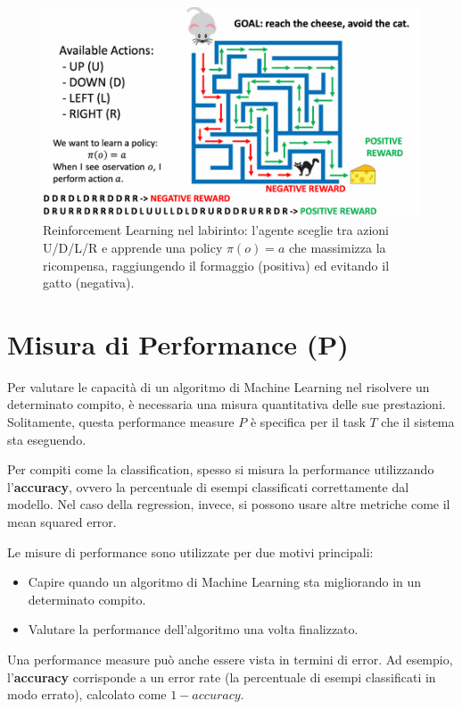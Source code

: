 \begin{figure}
    \centering
    \includegraphics[width=\textwidth]{images/reinforcementLearning.png}
    \caption{Reinforcement Learning nel labirinto: l’agente sceglie tra azioni U/D/L/R e apprende una policy \(\pi(o)=a\) che massimizza la ricompensa, raggiungendo il formaggio (positiva) ed evitando il gatto (negativa).}
\label{fig:reinforcementLearning}
\end{figure}

\section{Misura di Performance (P)}

Per valutare le capacità di un algoritmo di Machine Learning nel risolvere un determinato compito, è necessaria una misura quantitativa delle sue prestazioni. Solitamente, questa performance measure \( P \) è specifica per il task \( T \) che il sistema sta eseguendo.

Per compiti come la classification, spesso si misura la performance utilizzando l'\textbf{accuracy}, ovvero la percentuale di esempi classificati correttamente dal modello. Nel caso della regression, invece, si possono usare altre metriche come il mean squared error.

\noindent
Le misure di performance sono utilizzate per due motivi principali:

\begin{itemize}
\item Capire quando un algoritmo di Machine Learning sta migliorando in un determinato compito.
\item Valutare la performance dell'algoritmo una volta finalizzato.
\end{itemize}

\noindent
Una performance measure può anche essere vista in termini di error. Ad esempio, l'\textbf{accuracy} corrisponde a un error rate (la percentuale di esempi classificati in modo errato), calcolato come \( 1 - accuracy \).

